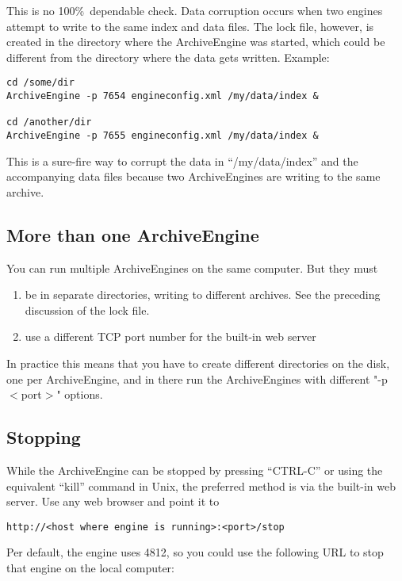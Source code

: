 \NOTE This is no 100\%\ dependable check. Data corruption occurs when
two engines attempt to write to the same index and data files. The
lock file, however, is created in the directory where the
ArchiveEngine was started, which could be different from the directory
where the data gets written. Example:

\begin{lstlisting}[frame=none,keywordstyle=\sffamily]
cd /some/dir
ArchiveEngine -p 7654 engineconfig.xml /my/data/index &

cd /another/dir
ArchiveEngine -p 7655 engineconfig.xml /my/data/index &
\end{lstlisting}

\noindent This is a sure-fire way to corrupt the data in
``/my/data/index'' and the accompanying data files because two
ArchiveEngines are writing to the same archive.

\subsection{More than one ArchiveEngine}
You can run multiple ArchiveEngines on the same
computer. But they must
\begin{enumerate}
\item be in separate directories, writing to different archives.
      See the preceding discussion of the lock file.
\item use a different TCP port number for the built-in web server
\end{enumerate}
In practice this means that you have to create different directories
on the disk, one per ArchiveEngine, and in there run the
ArchiveEngines with different "-p $<$port$>$" options.

\subsection{Stopping}
While the ArchiveEngine can be stopped by pressing ``CTRL-C''
or using the equivalent ``kill'' command in Unix, the preferred method is
via the built-in web server. Use any web browser and point it to

\begin{lstlisting}[frame=none,keywordstyle=\sffamily]
    http://<host where engine is running>:<port>/stop
\end{lstlisting}

\noindent Per default, the engine uses 4812, so you could use the
following URL to stop that engine on the local computer:

